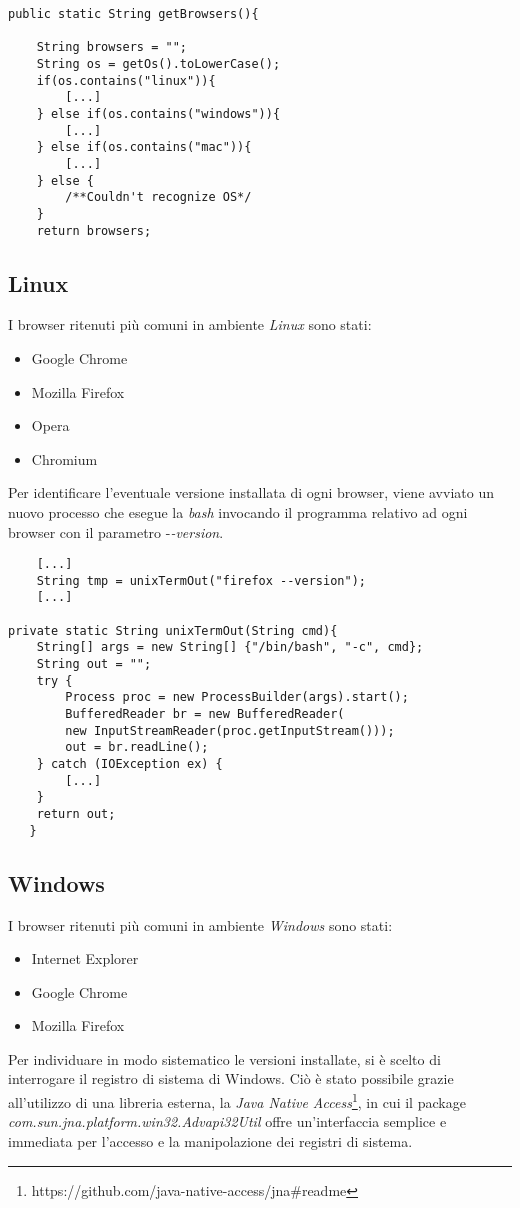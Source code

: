\vspace{0.5cm}
\begin{lstlisting}
public static String getBrowsers(){

	String browsers = "";
	String os = getOs().toLowerCase();
	if(os.contains("linux")){
		[...]
	} else if(os.contains("windows")){
		[...]
	} else if(os.contains("mac")){
		[...]
	} else {
		/**Couldn't recognize OS*/
	}
	return browsers;
\end{lstlisting}

\subsection{Linux}
I browser ritenuti pi\`{u} comuni in ambiente \textit{Linux} sono stati:
\begin{itemize}
	\item Google Chrome
	\item Mozilla Firefox
	\item Opera
	\item Chromium
\end{itemize}
Per identificare l'eventuale versione installata di ogni browser, viene avviato un nuovo processo che esegue la \textit{bash} invocando il programma relativo ad ogni browser con il parametro -\textit{-version}.

\vspace{0.5cm}
\begin{lstlisting}
	[...]
	String tmp = unixTermOut("firefox --version");
	[...]

private static String unixTermOut(String cmd){
    String[] args = new String[] {"/bin/bash", "-c", cmd};
    String out = "";
    try {
	    Process proc = new ProcessBuilder(args).start();
	    BufferedReader br = new BufferedReader(
	    new InputStreamReader(proc.getInputStream()));
	    out = br.readLine();
    } catch (IOException ex) {
	    [...]
    }
    return out;
   }
\end{lstlisting}

\subsection{Windows}
I browser ritenuti pi\`{u} comuni in ambiente \textit{Windows} sono stati:
\begin{itemize}
	\item Internet Explorer
	\item Google Chrome
	\item Mozilla Firefox
\end{itemize}
Per individuare in modo sistematico le versioni installate, si \`{e} scelto di interrogare il registro di sistema di Windows.
Ci\`{o} \`{e} stato possibile grazie all'utilizzo di una libreria esterna, la
\textit{Java Native Access}\footnote{https://github.com/java-native-access/jna\#readme}, in cui il package \textit{com.sun.jna.platform.win32.Advapi32Util} offre un'interfaccia semplice e immediata per l'accesso e la manipolazione dei registri di sistema.

